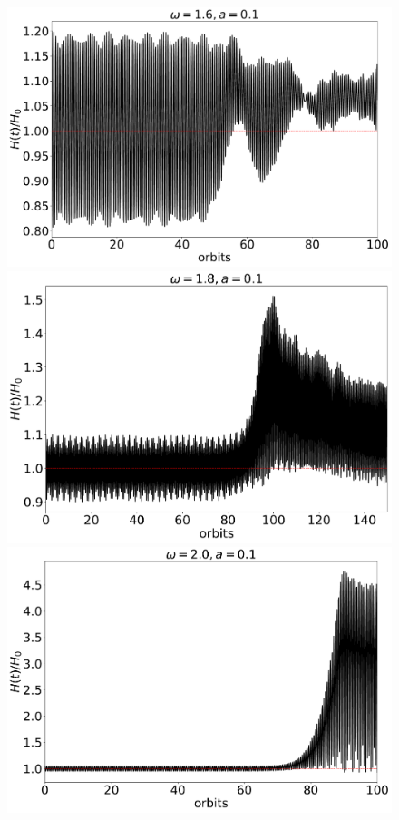 \documentclass[fleqn,usenatbib]{mnras}
\begin{document}
\begin{figure}
\includegraphics[scale=0.16]{Figures/figure00PRODUCTION_VSTRHYDRORes32Re4687H6ForcedBouncezBCReflectiveLx15Hw1pt6a0pt1_timeevolution_dynamicalH.pdf}
\includegraphics[scale=0.16]{Figures/figure00PRODUCTION_VSTRHYDRORes32Re4687H6ForcedBouncezBCReflectiveLx30Hw1pt8a0pt1InitialH1pt1_timeevolution_dynamicalH.pdf}
\includegraphics[scale=0.16]{Figures/figure00PRODUCTION_VSTRHYDRORes32Re4687H6ForcedBouncezBCReflectiveLx30Hw2pt0a0pt1_timeevolution_dynamicalH.pdf}

\end{figure}
\end{document}
